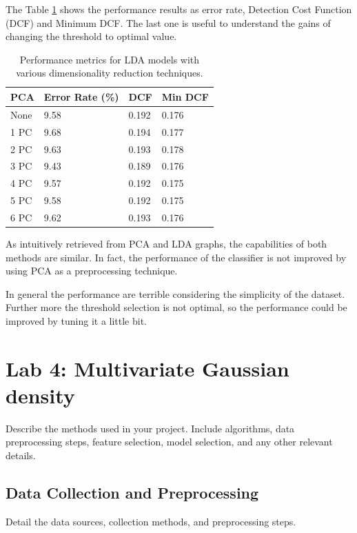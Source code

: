 \documentclass{article}
\begin{document}
The Table \ref{tab:lda_performance} shows the performance results as error rate, Detection Cost Function (DCF) and Minimum DCF. The last one is useful to understand the gains of changing the threshold to optimal value.

\begin{table}[ht!]
    \centering
    \begin{tabularx}{\textwidth}{lXXX}
        \toprule
        \textbf{PCA} & \textbf{Error Rate (\%)} & \textbf{DCF} & \textbf{Min DCF} \\
        \midrule
        None   & 9.58 & 0.192 & 0.176 \\
        1 PC  & 9.68 & 0.194 & 0.177 \\
        2 PC  & 9.63 & 0.193 & 0.178 \\
        3 PC  & 9.43 & 0.189 & 0.176 \\
        4 PC  & 9.57 & 0.192 & 0.175 \\
        5 PC  & 9.58 & 0.192 & 0.175 \\
        6 PC  & 9.62 & 0.193 & 0.176 \\
        \bottomrule
    \end{tabularx}
    \caption{Performance metrics for LDA models with various dimensionality reduction techniques.}
    \label{tab:lda_performance}
\end{table}

As intuitively retrieved from PCA and LDA graphs, the capabilities of both methods are similar. In fact, the performance of the classifier is not improved by using PCA as a preprocessing technique. 

In general the performance are terrible considering the simplicity of the dataset. Further more the threshold selection is not optimal, so the performance could be improved by tuning it a little bit.

\section{Lab 4: Multivariate Gaussian density}
\label{sec:multivariate_gaussian}
Describe the methods used in your project. Include algorithms, data preprocessing steps, feature selection, model selection, and any other relevant details.

\subsection{Data Collection and Preprocessing}
Detail the data sources, collection methods, and preprocessing steps.
\end{document}
